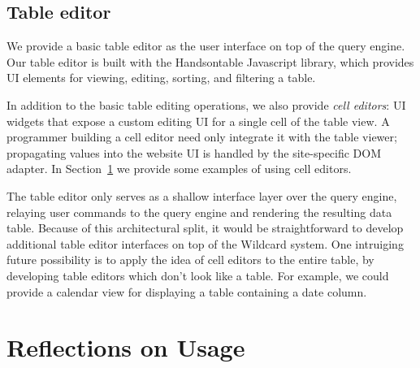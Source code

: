 \documentclass[sigplan,screen,10pt,anonymous,review]{acmart}
\begin{document}
\hypertarget{table-editor}{%
\subsection{Table editor}\label{table-editor}}

We provide a basic table editor as the user interface on top of the
query engine. Our table editor is built with the Handsontable Javascript
library, which provides UI elements for viewing, editing, sorting, and
filtering a table.

In addition to the basic table editing operations, we also provide
\emph{cell editors}: UI widgets that expose a custom editing UI for a
single cell of the table view. A programmer building a cell editor need
only integrate it with the table viewer; propagating values into the
website UI is handled by the site-specific DOM adapter. In
Section~\ref{sec:reflections} we provide some examples of using cell
editors.

The table editor only serves as a shallow interface layer over the query
engine, relaying user commands to the query engine and rendering the
resulting data table. Because of this architectural split, it would be
straightforward to develop additional table editor interfaces on top of
the Wildcard system. One intruiging future possibility is to apply the
idea of cell editors to the entire table, by developing table editors
which don't look like a table. For example, we could provide a calendar
view for displaying a table containing a date column.

\hypertarget{sec:reflections}{%
\section{Reflections on Usage}\label{sec:reflections}}
\end{document}

